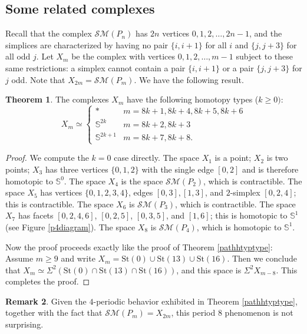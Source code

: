 \documentclass{amsart}
\theoremstyle{definition}
\newtheorem{theorem}{Theorem}[section]
\newtheorem{remark}[theorem]{Remark}
\newcommand{\zs}{{\mathbb S}}
\newcommand{\sm}{{\mathcal{SM}}}
\begin{document}
\subsection*{Some related complexes} Recall that the complex $\sm(P_n)$ has $2n$ vertices $0,1,2,\dots ,2n-1$, and the simplices are characterized by having no pair $\{i,i+1\}$ for all $i$ and $\{j,j+3\}$ for all odd $j$. Let $X_m$ be the complex with vertices $0,1,2,\dots ,m-1$ subject to these same restrictions: a simplex cannot contain a pair $\{i,i+1\}$ or a pair $\{j,j+3\}$ for $j$ odd. Note that $X_{2m} = \sm(P_m)$. We have the following result.

\begin{theorem}\label{xmthm}
    The complexes $X_m$ have the following homotopy types ($k\ge 0)$:
    $$X_m\simeq \begin{cases}
        \ast & m = 8k+1, 8k+4, 8k+5, 8k+6 \\
        \zs^{2k} & m=8k+2, 8k+3 \\
        \zs^{2k+1} & m=8k+7,8k+8.
    \end{cases}$$
\end{theorem}

\begin{proof}
    We compute the $k=0$ case directly. The space $X_1$ is a point; $X_2$ is two points; $X_3$ has three vertices $\{0,1,2\}$ with the single edge $[0,2]$ and is therefore homotopic to $\zs^0$. The space $X_4$ is the space $\sm(P_2)$, which is contractible. The space $X_5$ has vertices $\{0,1,2,3,4\}$, edges $[0,3], [1,3]$, and $2$-simplex $[0,2,4]$; this is contractible. The space $X_6$ is $\sm(P_3)$, which is contractible. The space $X_7$ has facets $[0,2,4,6]$, $[0,2,5]$, $[0,3,5]$, and $[1,6]$; this is homotopic to $\zs^1$ (see Figure \ref{p4diagram}). The space $X_8$ is $\sm(P_4)$, which is homotopic to $\zs^1$.

    Now the proof proceeds exactly like the proof of Theorem \ref{pathhtyptype}: Assume $m\ge 9$ and write $X_m=\text{St}(0) \cup \text{St}(13) \cup \text{St}(16)$. Then we conclude that $X_m\simeq \Sigma^2(\text{St}(0) \cap \text{St}(13) \cap \text{St}(16))$, and this space is $\Sigma^2X_{m-8}$. This completes the proof.
\end{proof}

\begin{remark}
    Given the $4$-periodic behavior exhibited in Theorem \ref{pathhtyptype}, together with the fact that $\sm(P_m)=X_{2m}$, this period $8$ phenomenon is not surprising.
\end{remark}
\end{document}
